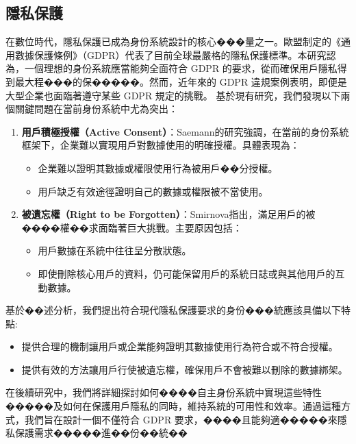 \subsection{隱私保護}
在數位時代，隱私保護已成為身份系統設計的核心���量之一。歐盟制定的《通用數據保護條例》（GDPR）代表了目前全球最嚴格的隱私保護標準。本研究認為，一個理想的身份系統應當能夠全面符合 GDPR 的要求，從而確保用戶隱私得到最大程���的保�����。然而，近年來的 GDPR 違規案例表明，即便是大型企業也面臨著遵守某些 GDPR 規定的挑戰。\newline
基於現有研究，我們發現以下兩個關鍵問題在當前身份系統中尤為突出：
\begin{enumerate}
  \item \textbf{用戶積極授權（Active Consent）}：Saemann\cite{saemann2022investigating}的研究強調，在當前的身份系統框架下，企業難以實現用戶對數據使用的明確授權。具體表現為：
        \begin{itemize}
          \item 企業難以證明其數據或權限使用行為被用戶��分授權。
          \item 用戶缺乏有效途徑證明自己的數據或權限被不當使用。
        \end{itemize}
  \item \textbf{被遺忘權（Right to be Forgotten）}：Smirnova\cite{smirnova2024understanding}指出，滿足用戶的被����權��求面臨著巨大挑戰。主要原因包括：
        \begin{itemize}
          \item 用戶數據在系統中往往呈分散狀態。
          \item 即使刪除核心用戶的資料，仍可能保留用戶的系統日誌或與其他用戶的互動數據。
        \end{itemize}
\end{enumerate}
基於��述分析，我們提出符合現代隱私保護要求的身份���統應該具備以下特點:
\begin{itemize}
  \item 提供合理的機制讓用戶或企業能夠證明其數據使用行為符合或不符合授權。
  \item 提供有效的方法讓用戶行使被遺忘權，確保用戶不會被難以刪除的數據綁架。
\end{itemize}
在後續研究中，我們將詳細探討如何����自主身份系統中實現這些特性�����及如何在保護用戶隱私的同時，維持系統的可用性和效率。通過這種方式，我們旨在設計一個不僅符合 GDPR 要求，����且能夠適�����來隱私保護需求�����進��份��統��
